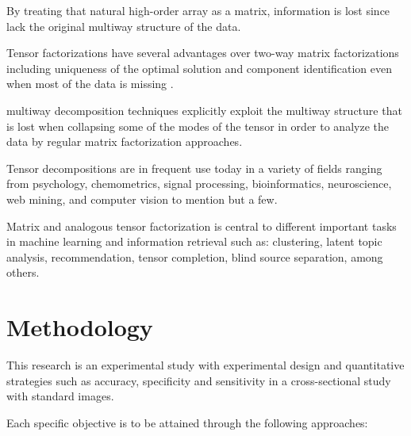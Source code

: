 \documentclass[letterpaper,12pt]{article}
\begin{document}
By treating that natural high-order array as a matrix, information is lost since lack the original multiway structure of the data.


Tensor factorizations have several advantages over two-way matrix factorizations including uniqueness of the optimal solution and component identification even when most of the data is missing \cite{Morup2011}. 

multiway decomposition techniques explicitly exploit the multiway structure that is lost when collapsing some of the modes of the tensor in order to analyze the data by regular matrix factorization approaches.

Tensor decompositions are in frequent use today in a variety of fields ranging from psychology, chemometrics, signal processing, bioinformatics, neuroscience, web mining, and computer vision to mention but a few.

Matrix and analogous tensor factorization is central to different important tasks in machine learning and information retrieval such as: clustering, latent topic analysis, recommendation, tensor completion, blind source separation, among others.



\section{Methodology}


This research is an experimental study with experimental design and quantitative strategies such as accuracy, specificity and sensitivity in a cross-sectional study with standard images.

Each specific objective is to be attained through the following approaches:
\end{document}
